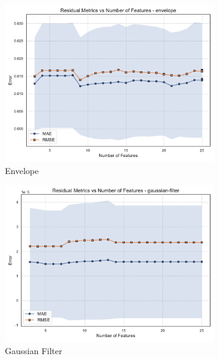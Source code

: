 \begin{figure}[htbp]
    \centering
    \begin{subfigure}[t]{0.32\textwidth}
        \includegraphics[width=\textwidth]{assets/images/05/residual_metrics_by_number_of_features_envelope}
        \caption{Envelope}
    \end{subfigure}
    \hfill
    \begin{subfigure}[t]{0.32\textwidth}
        \includegraphics[width=\textwidth]{assets/images/05/residual_metrics_by_number_of_features_gaussian-filter}
        \caption{Gaussian Filter}
    \end{subfigure}
    \hfill
    \begin{subfigure}[t]{0.32\textwidth}

\end{subfigure}
\end{figure}
